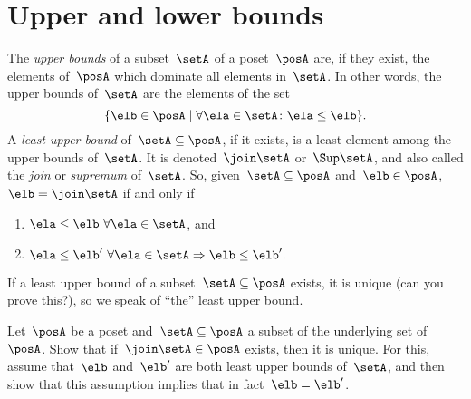 
\section{Upper and lower bounds}
\begin{ctdefinition}
    \label{def:least-upper-bound}
    The \emph{upper bounds} of a subset~$\setA$ of a poset~$\posA$ are, if they exist, the elements of~$\posA$ which dominate all elements in~$\setA$.
    In other words, the upper bounds of~$\setA$ are the elements of the set
    \begin{equation*}
        \{ \elb \in \posA \mid \forall \ela \in \setA  \colon \ela \leq \elb \}.
    \end{equation*}
    A \emph{least upper bound} of~$\setA \subseteq \posA$, if it exists, is a least element among the upper bounds of~$\setA$.
    It is denoted~$\join \setA$ or~$\Sup\setA$, and also called the \emph{join} or \emph{supremum} of~$\setA$.
    So, given~$\setA \subseteq \posA$ and~$\elb \in \posA$,~$\elb =  \join \setA$ if and only if
    \begin{enumerate}
        \item $\ela \leq \elb \ \forall \ela \in \setA$, and
        \item $\ela \leq \elb' \ \forall \ela \in \setA \Rightarrow \elb \leq \elb'.$
    \end{enumerate}
    If a least upper bound of a subset~$\setA \subseteq \posA$ exists, it is unique (can you prove this?), so we speak of ``the'' least upper bound.
\end{ctdefinition}

\begin{exercise}
    Let~$\posA$ be a poset and~$\setA \subseteq \posA$ a subset of the underlying set of~$\posA$.
    Show that if~$\join \setA \in \posA$ exists, then it is unique.
    For this, assume that~$\elb$ and~$\elb'$ are both least upper bounds of~$\setA$, and then show that this assumption implies that in fact~$\elb = \elb'$.
\end{exercise}
\begin{solution}
\end{solution}

